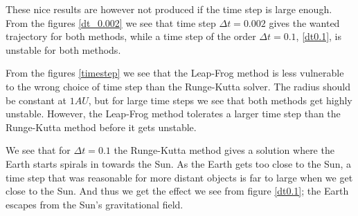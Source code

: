\documentclass[a4paper,12pt, english]{article}
\begin{document}
These nice results are however not produced if the time step is large enough. From the figures \ref{dt_0.002} we see that time step $\Delta t = 0.002$ gives the wanted trajectory for both methods, while a time step of the order $\Delta t = 0.1$, \ref{dt0.1}, is unstable for both methods.

From the figures \ref{timestep} we see that the Leap-Frog method is less vulnerable to the wrong choice of time step than the Runge-Kutta solver. The radius should be constant at $1 AU$, but for large time steps we see that both methods get highly unstable. However, the Leap-Frog method tolerates a larger time step than the Runge-Kutta method before it gets unstable.


We see that for $\Delta t = 0.1$ the Runge-Kutta method gives a solution where the Earth starts spirals in towards the Sun. As the Earth gets too close to the Sun, a time step that was reasonable for more distant objects is far to large when we get close to the Sun. And thus we get the effect we see from figure \ref{dt0.1}; the Earth escapes from the Sun's gravitational field.
\end{document}
